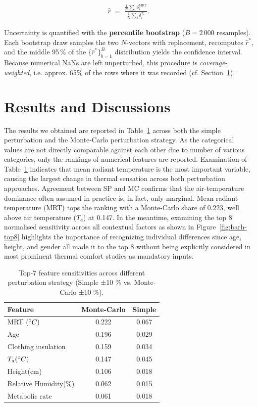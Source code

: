 \documentclass{article}
\theoremstyle{plain}
\theoremstyle{definition}
\theoremstyle{remark}
\begin{document}
\begin{align}
\hat{r}\;=\;
\frac{\frac{1}{N}\sum_{i}\delta_i^{\text{MRT}}}
     {\frac{1}{N}\sum_{i}\delta_i^{T_a}}.
\end{align}

Uncertainty is quantified with the \textbf{percentile bootstrap}
($B{=}2\,000$ resamples).  Each bootstrap draw samples the two
$N$-vectors with replacement, recomputes $\hat{r}^{\!*}$, and the middle
95\,\% of the $\{\hat{r}^{\!*}\}_{b=1}^{B}$ distribution yields the
confidence interval.
Because numerical NaNs are left unperturbed, this procedure is
\emph{coverage-weighted}, i.e. approx. 65\% of the rows where it was recorded (cf. Section~\ref{sec:discuss}).


\section{Results and Discussions}\label{sec:discuss}
The results we obtained are reported in Table~\ref{tab:top8} across both the simple perturbation and the Monte-Carlo perturbation strategy. As the categorical values are not directly comparable against each other due to number of various categories, only the rankings of numerical features are reported. Examination of Table~\ref{tab:top8} indicates that mean radiant temperature is the most important variable, causing the largest change in thermal sensation across both perturbation approaches. Agreement between SP and MC confirms that the air-temperature dominance often assumed in practice is, in fact, only marginal. Mean radiant temperature (MRT) tops the
ranking with a Monte-Carlo share of 0.223, well above air temperature ($T_a$) at 0.147. In the meantime, examining the top 8 normalised sensitivity across all contextual factors as shown in Figure~\ref{fig:barh-top8} highlights the importance of recognizing individual differences since age, height, and gender all made it to the top 8 without being explicitly considered in most prominent thermal comfort studies as mandatory inputs.

\begin{table}[h!]
\caption{Top-7 feature sensitivities across different perturbation strategy (Simple ±10 \% vs. Monte-Carlo ±10 \%).}
\label{tab:top8}
\begin{tabular}{lcc}
\toprule
Feature & Monte-Carlo & Simple \\
\midrule
MRT $(\degree C)$ & 0.222 & 0.067 \\
Age & 0.196 & 0.029 \\
Clothing insulation & 0.159 & 0.034 \\
$T_a (\degree C)$ & 0.147 & 0.045 \\
Height(cm) & 0.106 & 0.018 \\
Relative Humidity(\%) & 0.062 & 0.015 \\
Metabolic rate & 0.061 & 0.018 \\
\bottomrule
\end{tabular} 
\end{table}
\end{document}
